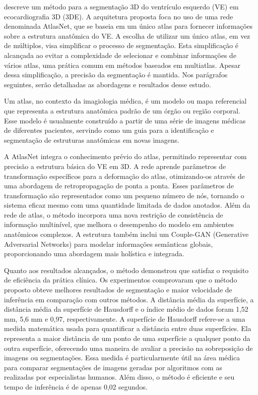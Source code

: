 
\textcite{DONG2020101638} descreve um método para a segmentação 3D do ventrículo esquerdo (VE) em ecocardiografia 3D (3DE). A arquitetura proposta foca no uso de uma rede denominada AtlasNet, que se baseia em um único atlas para fornecer informações sobre a estrutura anatômica do VE. A escolha de utilizar um único atlas, em vez de múltiplos, visa simplificar o processo de segmentação. Esta simplificação é alcançada ao evitar a complexidade de selecionar e combinar informações de vários atlas, uma prática comum em métodos baseados em multiatlas. Apesar dessa simplificação, a precisão da segmentação é mantida. Nos parágrafos seguintes, serão detalhadas as abordagens e resultados desse estudo.

Um atlas, no contexto da imagiologia médica, é um modelo ou mapa referencial que representa a estrutura anatômica padrão de um órgão ou região corporal. Esse modelo é usualmente construído a partir de uma série de imagens médicas de diferentes pacientes, servindo como um guia para a identificação e segmentação de estruturas anatômicas em novas imagens.

A AtlasNet integra o conhecimento prévio do atlas, permitindo representar com precisão a estrutura básica do VE em 3D. A rede aprende parâmetros de transformação específicos para a deformação do atlas, otimizando-os através de uma abordagem de retropropagação de ponta a ponta. Esses parâmetros de transformação são representados como um pequeno número de nós, tornando o sistema eficaz mesmo com uma quantidade limitada de dados anotados. Além da rede de atlas, o método incorpora uma nova restrição de consistência de informação multinível, que melhora o desempenho do modelo em ambientes anatômicos complexos. A estrutura também inclui um Couple-GAN (Generative Adversarial Networks) para modelar informações semânticas globais, proporcionando uma abordagem mais holística e integrada.

Quanto aos resultados alcançados, o método demonstrou que satisfaz o requisito de eficiência da prática clínica. Os experimentos comprovaram que o método proposto obteve melhores resultados de segmentação e maior velocidade de inferência em comparação com outros métodos. A distância média da superfície, a distância média da superfície de Hausdorff e o índice médio de dados foram 1,52 mm, 5,6 mm e 0,97, respectivamente. A superfície de Hausdorff refere-se a uma medida matemática usada para quantificar a distância entre duas superfícies. Ela representa a maior distância de um ponto de uma superfície a qualquer ponto da outra superfície, oferecendo uma maneira de avaliar a precisão na sobreposição de imagens ou segmentações. Essa medida é particularmente útil na área médica para comparar segmentações de imagens geradas por algoritmos com as realizadas por especialistas humanos. Além disso, o método é eficiente e seu tempo de inferência é de apenas 0,02 segundos.

